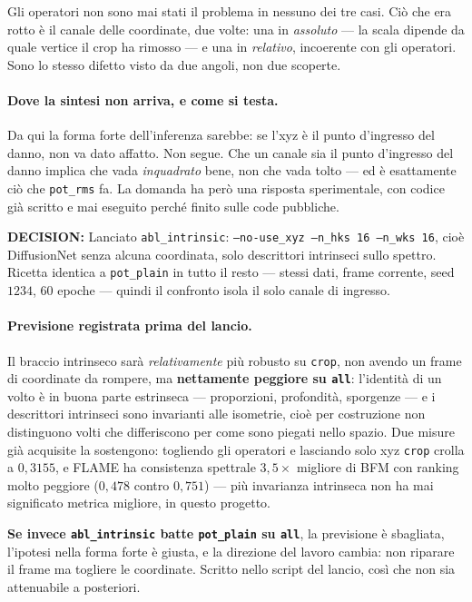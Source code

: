 \documentclass[11pt,a4paper]{article}
\newcommand{\decision}[1]{\textcolor{decision}{\textbf{DECISION:}} #1}
\begin{document}
Gli operatori non sono mai stati il problema in nessuno dei tre casi. Ci\`o che era rotto \`e il
canale delle coordinate, due volte: una in \emph{assoluto} --- la scala dipende da quale vertice
il crop ha rimosso --- e una in \emph{relativo}, incoerente con gli operatori. Sono lo stesso
difetto visto da due angoli, non due scoperte.

\paragraph{Dove la sintesi non arriva, e come si testa.} Da qui la forma forte
dell'inferenza sarebbe: se l'xyz \`e il punto d'ingresso del danno, non va dato affatto. Non
segue. Che un canale sia il punto d'ingresso del danno implica che vada \emph{inquadrato} bene,
non che vada tolto --- ed \`e esattamente ci\`o che \texttt{pot\_rms} fa. La domanda ha per\`o una
risposta sperimentale, con codice gi\`a scritto e mai eseguito perch\'e finito sulle code
pubbliche.

\decision{Lanciato \texttt{abl\_intrinsic}: \texttt{--no-use\_xyz --n\_hks 16 --n\_wks 16}, cio\`e
DiffusionNet senza alcuna coordinata, solo descrittori intrinseci sullo spettro. Ricetta
identica a \texttt{pot\_plain} in tutto il resto --- stessi dati, frame corrente, seed $1234$,
$60$ epoche --- quindi il confronto isola il solo canale di ingresso.}

\paragraph{Previsione registrata prima del lancio.} Il braccio intrinseco sar\`a
\emph{relativamente} pi\`u robusto su \texttt{crop}, non avendo un frame di coordinate da
rompere, ma \textbf{nettamente peggiore su \texttt{all}}: l'identit\`a di un volto \`e in buona
parte estrinseca --- proporzioni, profondit\`a, sporgenze --- e i descrittori intrinseci sono
invarianti alle isometrie, cio\`e per costruzione non distinguono volti che differiscono per
come sono piegati nello spazio. Due misure gi\`a acquisite la sostengono: togliendo gli operatori
e lasciando solo xyz \texttt{crop} crolla a $0{,}3155$, e FLAME ha consistenza spettrale
$3{,}5\times$ migliore di BFM con ranking molto peggiore ($0{,}478$ contro $0{,}751$) --- pi\`u
invarianza intrinseca non ha mai significato metrica migliore, in questo progetto.

\textbf{Se invece \texttt{abl\_intrinsic} batte \texttt{pot\_plain} su \texttt{all}}, la
previsione \`e sbagliata, l'ipotesi nella forma forte \`e giusta, e la direzione del lavoro
cambia: non riparare il frame ma togliere le coordinate. Scritto nello script del lancio, cos\`i
che non sia attenuabile a posteriori.
\end{document}

